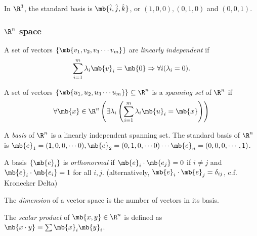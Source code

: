 \documentclass[a4paper]{article}
\begin{document}
In $\R^3$, the standard basis is $\mb{\hat{i}, \hat{j}, \hat{k}}$, or $(1, 0, 0), (0, 1, 0)$ and $(0, 0, 1)$.
\subsubsection{\texorpdfstring{$\R^n$}{Rn} space}
\begin{defi}
  A set of vectors $\{\mb{v_1, v_2, v_3\cdots v_m}\}$ are \emph{linearly independent} if
\[
\sum_{i = 1}^m\lambda_i\mb{v}_i = \mb{0} \Rightarrow \forall i(\lambda_i = 0).
\]
\end{defi}
\begin{defi}
  A set of vectors $\{\mb{u_1, u_2, u_3\cdots u_m}\}\subseteq \R^n$ is a \emph{spanning set} of $\R^n$ if
  \[
  \forall \mb{x} \in \R^n\left(\exists \lambda_i\left(\sum_{i = 1}^m\lambda_i\mb{u}_i = \mb{x}\right)\right)
  \]
\end{defi}

\begin{defi}
  A \emph{basis} of $\R^n$ is a linearly independent spanning set. The standard basis of $\R^n$ is $\mb{e}_1 = (1, 0, 0, \cdots 0), \mb{e}_2 = (0, 1, 0, \cdots 0)\cdots \mb{e}_n = (0, 0, 0, \cdots, 1)$.
\end{defi}

\begin{defi}
  A basis $\{\mb{e}_i\}$ is \emph{orthonormal} if $\mb{e}_i\cdot \mb{e_j} = 0$ if $i\not= j$ and $\mb{e}_i\cdot \mb{e_i} = 1$ for all $i, j$. (alternatively, $\mb{e}_i\cdot \mb{e}_j = \delta_{ij}$, c.f. Kronecker Delta)
\end{defi}

\begin{defi}
  The \emph{dimension} of a vector space is the number of vectors in its basis. 
\end{defi}
\begin{defi}
  The \emph{scalar product} of $\mb{x, y}\in \R^n$ is defined as $\mb{x\cdot y} = \sum \mb{x}_i\mb{y}_i$.
\end{defi}
\end{document}
